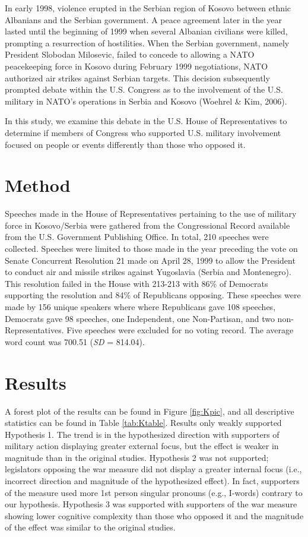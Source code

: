 \documentclass[english,,man]{apa6}
\begin{document}
In early 1998, violence erupted in the Serbian region of Kosovo between ethnic Albanians and the Serbian government. A peace agreement later in the year lasted until the beginning of 1999 when several Albanian civilians were killed, prompting a resurrection of hostilities. When the Serbian government, namely President Slobodan Milosevic, failed to concede to allowing a NATO peacekeeping force in Kosovo during February 1999 negotiations, NATO authorized air strikes against Serbian targets. This decision subsequently prompted debate within the U.S. Congress as to the involvement of the U.S. military in NATO's operations in Serbia and Kosovo (Woehrel \& Kim, 2006).

In this study, we examine this debate in the U.S. House of Representatives to determine if members of Congress who supported U.S. military involvement focused on people or events differently than those who opposed it.

\hypertarget{method}{%
\section{Method}\label{method}}

Speeches made in the House of Representatives pertaining to the use of military force in Kosovo/Serbia were gathered from the Congressional Record available from the U.S. Government Publishing Office. In total, 210 speeches were collected. Speeches were limited to those made in the year preceding the vote on Senate Concurrent Resolution 21 made on April 28, 1999 to allow the President to conduct air and missile strikes against Yugoslavia (Serbia and Montenegro). This resolution failed in the House with 213-213 with 86\% of Democrats supporting the resolution and 84\% of Republicans opposing. These speeches were made by 156 unique speakers where where Republicans gave 108 speeches, Democrats gave 98 speeches, one Independent, one Non-Partisan, and two non-Representatives. Five speeches were excluded for no voting record. The average word count was 700.51 (\emph{SD} = 814.04).

\hypertarget{results}{%
\section{Results}\label{results}}

A forest plot of the results can be found in Figure \ref{fig:Kpic}, and all descriptive statistics can be found in Table \ref{tab:Ktable}. Results only weakly supported Hypothesis 1. The trend is in the hypothesized direction with supporters of military action displaying greater external focus, but the effect is weaker in magnitude than in the original studies. Hypothesis 2 was not supported; legislators opposing the war measure did not display a greater internal focus (i.e., incorrect direction and magnitude of the hypothesized effect). In fact, supporters of the measure used more 1st person singular pronouns (e.g., I-words) contrary to our hypothesis. Hypothesis 3 was supported with supporters of the war measure showing lower cognitive complexity than those who opposed it and the magnitude of the effect was similar to the original studies.
\end{document}

